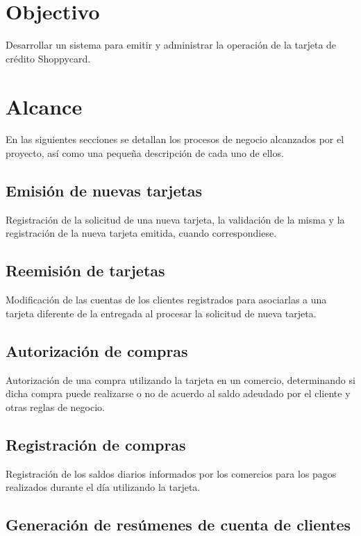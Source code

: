 \section{Objectivo}

Desarrollar un sistema para emitir y administrar la operación de la tarjeta de
crédito Shoppycard.


\section{Alcance}

En las siguientes secciones se detallan los procesos de negocio alcanzados por
el proyecto, así como una pequeña descripción de cada uno de ellos.

\subsection{Emisión de nuevas tarjetas}

Registración de la solicitud de una nueva tarjeta, la validación de la misma y
la registración de la nueva tarjeta emitida, cuando correspondiese.

\subsection{Reemisión de tarjetas}

Modificación de las cuentas de los clientes registrados para asociarlas a una
tarjeta diferente de la entregada al procesar la solicitud de nueva tarjeta.

\subsection{Autorización de compras}

Autorización de una compra utilizando la tarjeta en un comercio, determinando si
dicha compra puede realizarse o no de acuerdo al saldo adeudado por el cliente y
otras reglas de negocio.

\subsection{Registración de compras}

Registración de los saldos diarios informados por los comercios para los pagos
realizados durante el día utilizando la tarjeta.

\subsection{Generación de resúmenes de cuenta de clientes}

